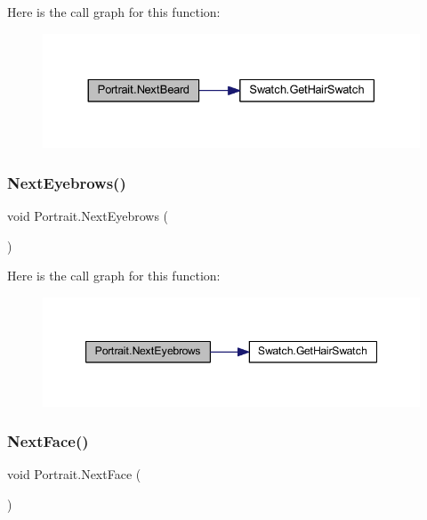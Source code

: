 Here is the call graph for this function\+:\nopagebreak
\begin{figure}[H]
\begin{center}
\leavevmode
\includegraphics[width=330pt]{class_portrait_a357f23630fd1689f2de8ef7a114c151e_cgraph}
\end{center}
\end{figure}
\mbox{\label{class_portrait_a6390e5c0ba5e52e4913703caf40682cd}} 
\subsubsection{\texorpdfstring{NextEyebrows()}{NextEyebrows()}}
{\footnotesize\ttfamily void Portrait.\+Next\+Eyebrows (\begin{DoxyParamCaption}{ }\end{DoxyParamCaption})}

Here is the call graph for this function\+:\nopagebreak
\begin{figure}[H]
\begin{center}
\leavevmode
\includegraphics[width=347pt]{class_portrait_a6390e5c0ba5e52e4913703caf40682cd_cgraph}
\end{center}
\end{figure}
\mbox{\label{class_portrait_aaa0da57aae916077e97d6c9d0a48aa4d}} 
\subsubsection{\texorpdfstring{NextFace()}{NextFace()}}
{\footnotesize\ttfamily void Portrait.\+Next\+Face (\begin{DoxyParamCaption}{ }\end{DoxyParamCaption})}

